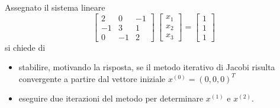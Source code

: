 Assegnato il sistema lineare
\[ \left[ \begin{array}{ccc}  2 & 0 & -1\\ -1 & 3 & 1\\ 0 & -1&2
\end{array} \right] \ \left[ \begin{array}{c}  x_1 \\ x_2 \\
x_3 
\end{array} \right] =
\left[ \begin{array}{c}  1 \\ 1 \\ 1 
\end{array} \right] \]
si chiede di
\begin{itemize}
\item
stabilire, motivando la risposta, se il metodo iterativo di
Jacobi risulta convergente a partire dal vettore iniziale
$x^{(0)}=(0,0,0)^T$
\item eseguire due iterazioni del metodo per determinare $x^{(1)}$ e
$x^{(2)}$.
\end{itemize}